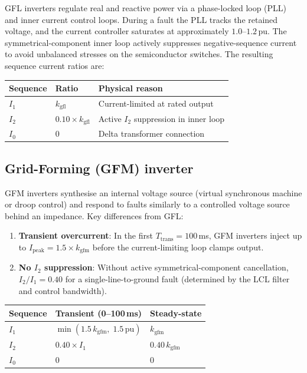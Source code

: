 \documentclass[11pt,a4paper]{article}
\begin{document}
GFL inverters regulate real and reactive power via a phase-locked loop (PLL) and
inner current control loops.  During a fault the PLL tracks the retained voltage,
and the current controller saturates at approximately $1.0$--$1.2$\,pu.  The
symmetrical-component inner loop actively suppresses negative-sequence current
to avoid unbalanced stresses on the semiconductor switches.  The resulting
sequence current ratios are:

\begin{center}
\begin{tabular}{@{}lll@{}}
\toprule
Sequence & Ratio & Physical reason \\
\midrule
$I_1$ & $k_\mathrm{gfl}$ & Current-limited at rated output \\
$I_2$ & $0.10 \times k_\mathrm{gfl}$ & Active $I_2$ suppression in inner loop \\
$I_0$ & $0$ & Delta transformer connection \\
\bottomrule
\end{tabular}
\end{center}

\subsection{Grid-Forming (GFM) inverter}

GFM inverters synthesise an internal voltage source (virtual synchronous machine
or droop control) and respond to faults similarly to a controlled voltage source
behind an impedance.  Key differences from GFL:

\begin{enumerate}
  \item \textbf{Transient overcurrent}: In the first $T_\mathrm{trans}=100$\,ms,
    GFM inverters inject up to $I_\mathrm{peak}=1.5\times k_\mathrm{gfm}$
    before the current-limiting loop clamps output.
  \item \textbf{No $I_2$ suppression}: Without active symmetrical-component
    cancellation, $I_2/I_1=0.40$ for a single-line-to-ground fault (determined
    by the LCL filter and control bandwidth).
\end{enumerate}

\begin{center}
\begin{tabular}{@{}lll@{}}
\toprule
Sequence & Transient (0--100\,ms) & Steady-state \\
\midrule
$I_1$ & $\min(1.5\,k_\mathrm{gfm},\;1.5\,\mathrm{pu})$ & $k_\mathrm{gfm}$ \\
$I_2$ & $0.40 \times I_1$ & $0.40\,k_\mathrm{gfm}$ \\
$I_0$ & $0$ & $0$ \\
\bottomrule
\end{tabular}
\end{center}
\end{document}
